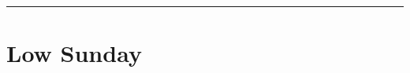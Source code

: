 {{{{            \def\vrlinebreak{T}
            \label{vr-manenobiscum}
        }
    }
    \newcommand{\printsundaysaftereaster}{%
        \def\dotting{\leaders\hbox to 1em{\hfil.\hfil}\hfill}%
        \vspace{-0.5\baselineskip}
        \begin{multicols}{2}%
        \noindent\emph{Low Sunday}\dotting p.~\pageref{easter1}\\
        \noindent\emph{\nth{2} Sunday after Easter},\dotting p.~\pageref{easter2}\\
        \emph{\nth{3} Sunday after Easter}\dotting p.~\pageref{easter3}\\
        \emph{\nth{4} Sunday after Easter}\dotting p.~\pageref{easter4}\\
        \emph{\nth{5} Sunday after Easter}\dotting p.~\pageref{easter5}\\
        \emph{Sunday after the Ascension}\dotting p.~\pageref{easter6}
        \end{multicols}
    }
    \newcommand{\chapterreplacement}{
        \bigskip
        {\centering\emph{Chapter of the Sunday.}\par}%
        \printsundaysaftereaster{}
    }
    \newcommand{\prehymn}{\needspace{24\baselineskip}}
    \newcommand{\magreplacement}{
        \oldneedspace{6\baselineskip}
        \bigskip
        {\centering\emph{Magnificat \& Collect of the Sunday.}\par}%
        \printsundaysaftereaster{}
        \benedicamusdominoreference{easter}
    }
    \newcommand{\collectreplacement}{\bigskip}
    \def\postpsalmtitletwo{\needspace{8\baselineskip}}
    \def\prepsalmtwoverses{}
    \def\prepsalmtitlethree{\vspace{-0.075\baselineskip}}
    \def\prepsalmtitlefour{\vspace{-0.075\baselineskip}}
    \def\prepsalmtitlefive{\oldneedspace{12\baselineskip}}
    \def\prepsalmfive{\greseteolcustos{manual}}
    \bigskip
    \hrule
}

{
\section{Low Sunday}
\label{easter1}
\printcommonvespers[1]

}}
